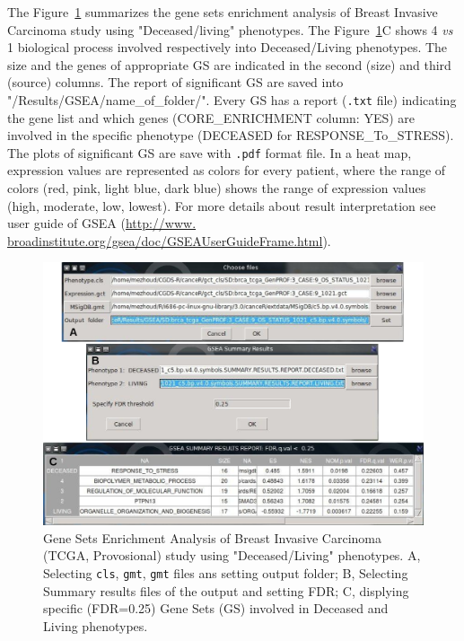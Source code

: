 \documentclass[a4paper]{article}
\begin{document}
The Figure~\ref{figbreastGSEA} summarizes the gene sets enrichment analysis of Breast Invasive Carcinoma study using "Deceased/living" phenotypes. The Figure~\ref{figbreastGSEA}C shows 4 \emph{vs} 1 biological process involved respectively  into Deceased/Living phenotypes. The size and the genes of appropriate GS are indicated in the second (size) and third (source) columns. The report of significant GS are saved into "/Results/GSEA/name\_of\_folder/". Every GS has a report (\texttt{.txt} file) indicating the gene list and which genes (CORE\_ENRICHMENT column: YES) are involved in the specific phenotype (DECEASED for RESPONSE\_To\_STRESS). The plots of significant GS are save with \texttt{.pdf} format file.  In a heat map, expression values are represented as colors for every patient, where the range of colors (red, pink, light blue, dark blue) shows the range of expression values (high, moderate, low, lowest). For more details about result interpretation see user guide of GSEA (\url{http://www.
broadinstitute.org/gsea/doc/GSEAUserGuideFrame.html}).

\begin{figure}[!ht]
  \centering
 \includegraphics[scale=2]{image/breastGSEA.png}
 \caption{Gene Sets Enrichment Analysis of Breast Invasive Carcinoma (TCGA, Provosional) study using "Deceased/Living" phenotypes. A, Selecting \texttt{cls}, \texttt{gmt}, \texttt{gmt} files ans setting output folder; B, Selecting Summary results files of the output and setting FDR; C, displying specific (FDR=0.25) Gene Sets (GS) involved in Deceased and Living phenotypes.}
 \label{figbreastGSEA}
 \end{figure}
 
 
 
\end{document}
